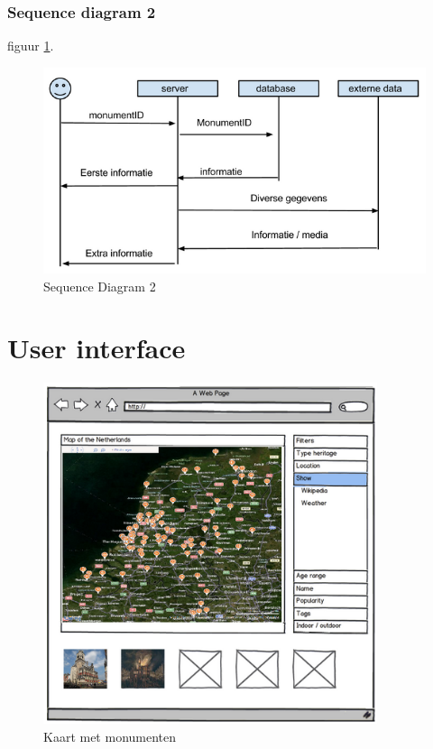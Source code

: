 \documentclass[a4paper,10pt]{article}
\newcommand{\rsection}[1]{
\section{#1}\label{sec:#1}
}
\newcommand{\rsubsubsection}[1]{
\subsubsection{#1}\label{sec:sub:sub:#1}
}
\begin{document}
			\rsubsubsection{Sequence diagram 2}
			figuur \ref{sequence2}.
			\begin{figure}[ht!]
				\centering
				\includegraphics[width=\textwidth]{sequence2.png}
				\caption{Sequence Diagram 2 \label{sequence2}}
			\end{figure}		
		\clearpage			
		\rsection{User interface}
			\begin{figure}[ht!]
			\centering
			\includegraphics[height=10cm]{interface1.png}
			\caption{Kaart met monumenten \label{interface1}}
			\end{figure}
	
\end{document}
